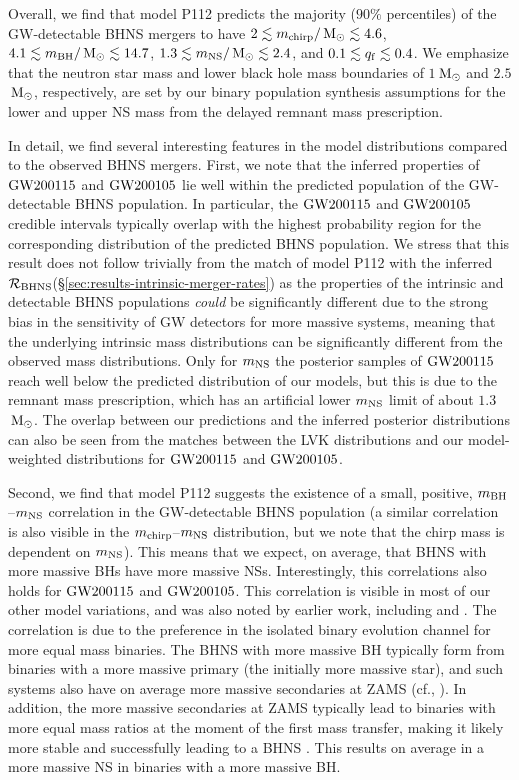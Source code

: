 \documentclass{aastex63}
\newcommand{\Msun}{\ensuremath{\,\rm{M}_{\odot}}\xspace}
\newcommand{\mnsf}{\ensuremath{m_{\rm{NS}}}\xspace}
\newcommand{\mbhf}{\ensuremath{m_{\rm{BH}}}\xspace}
\newcommand{\mchirpf}{\ensuremath{{m}_{\rm{chirp}}}\xspace}
\newcommand{\qf}{\ensuremath{q_{\rm{f}}}\xspace}
\newcommand{\Rbhns}{\ensuremath{\mathcal{R}_{\rm{BHNS}}}\xspace}
\newcommand{\gwone}{\ensuremath{\rm{GW200115}}\xspace}
\newcommand{\gwzero}{\ensuremath{\rm{GW200105}}\xspace}
\newcommand{\model}{P112\xspace}
\begin{document}
Overall, we find that model \model predicts the majority ($90\%$ percentiles) of the \ac{GW}-detectable \ac{BHNS} mergers to have $2 \lesssim \mchirpf /\Msun \lesssim 4.6$,  $4.1 \lesssim \mbhf / \Msun \lesssim 14.7$,  $1.3\lesssim \mnsf / \Msun \lesssim 2.4$, and $0.1\lesssim\qf\lesssim 0.4$. We emphasize that the neutron star mass and lower black hole mass boundaries of $1$\Msun and $2.5$\Msun, respectively, are set by our binary population synthesis assumptions for the lower and upper \ac{NS} mass from the delayed \citet{Fryer:2012} remnant mass prescription. 

In detail, we find several interesting features in the model distributions compared to the observed \ac{BHNS} mergers. First, we note that the inferred properties of \gwone and \gwzero lie well within the predicted population of the \ac{GW}-detectable \ac{BHNS} population. In particular, the \gwone and \gwzero credible intervals typically overlap with the highest probability region for the corresponding distribution of the predicted \ac{BHNS} population. 
% 
We stress that this result does not follow trivially from the match of model \model with the inferred \Rbhns (\S\ref{sec:results-intrinsic-merger-rates}) as the properties of the intrinsic and detectable \ac{BHNS} populations \emph{could} be significantly different due to the strong bias in the sensitivity of \ac{GW} detectors for more massive systems, meaning that the underlying intrinsic mass distributions can be significantly different from the observed mass distributions. Only for \mnsf the posterior samples of \gwone reach well below the predicted distribution of our models, but this is due to the remnant mass prescription, which has an artificial lower \mnsf limit of about $1.3$\Msun. The overlap between our predictions and the inferred posterior distributions can also be seen from the matches between the LVK distributions and our model-weighted distributions for \gwone and \gwzero. 

Second, we find that model \model suggests the existence of a small, positive, $\mbhf$--$\mnsf$ correlation in the GW-detectable \ac{BHNS} population (a similar correlation is also visible in the $\mchirpf$--$\mnsf$ distribution, but we note that the chirp mass is dependent on \mnsf). This means that we expect, on average, that \ac{BHNS} with more massive \acp{BH} have more massive \acp{NS}. Interestingly, this correlations also holds for \gwone and \gwzero. This correlation is visible in most of our other model variations, and was also noted by earlier work, including \citet{Kruckow:2018} and \citet{Broekgaarden:2021}. The correlation is due to the preference in the isolated binary evolution channel for more equal mass binaries. The \ac{BHNS} with more massive \ac{BH} typically form from binaries with a more massive primary (the initially more massive star), and such systems also have on average more massive secondaries at ZAMS (cf., \citealt{Sana:2012}). In addition, the more massive secondaries at ZAMS typically lead to binaries with more equal mass ratios at the moment of the first mass transfer, making it likely more stable and successfully leading to a \ac{BHNS}  \citep{Broekgaarden:2021}. This results on average in a more massive \ac{NS} in binaries with a more massive \ac{BH}.
\end{document}
